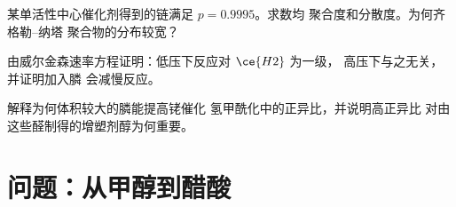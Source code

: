 \begin{exercise}[$\star\star\star$]\label{exo:b3:homogeneous-catalysis:10}
某单活性中心催化剂得到的链满足 $p = 0.9995$。求数均
聚合度和分散度。为何齐格勒–纳塔
聚合物的分布较宽？
\end{exercise}

\begin{exercise}[$\star\star\star$]\label{exo:b3:homogeneous-catalysis:11}
由威尔金森速率方程证明：低压下反应对 $\ce{H2}$ 为一级，
高压下与之无关，并证明加入膦
会减慢反应。
\end{exercise}

\begin{exercise}[$\star\star\star$]\label{exo:b3:homogeneous-catalysis:12}
解释为何体积较大的膦能提高铑催化
氢甲酰化中的正异比，并说明高正异比
对由这些醛制得的增塑剂醇为何重要。
\end{exercise}

\section{问题：从甲醇到醋酸}

